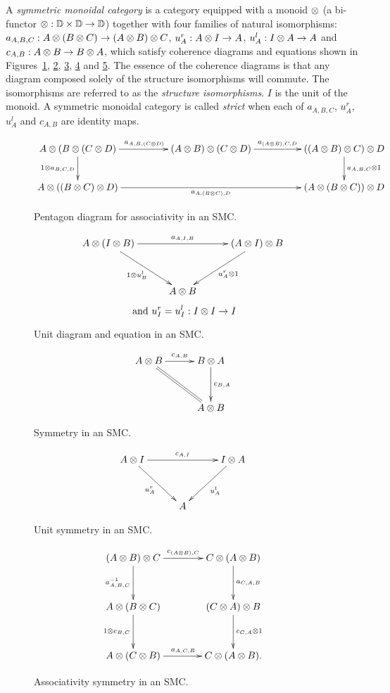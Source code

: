 \begin{definition}\label{symmetricmonoidalcat}
  A \emph{symmetric monoidal category}\cite{barr:ctcs,maclan97:categorieswrkmath} \cD{} is a
  category equipped with a monoid $\otimes$ (a bi-functor $\otimes:\mathbb{D} \times \mathbb{D} \to \mathbb{D}$) together with
  four families of natural isomorphisms:  $a_{A,B,C}:A\otimes(B\otimes C) \to (A\otimes B)\otimes C$, $u^r_{A}:A\otimes I\to A$,
  $u^l_{A}:I\otimes A \to A$ and $c_{A,B}:A\otimes B \to B\otimes A$, which satisfy coherence diagrams and
  equations shown in Figures~\ref{fig:SMC_pentagon}, \ref{fig:SMC_unit}, \ref{fig:SMC_commutes},
  \ref{fig:SMC_unit_symmettry} and \ref{fig:SMC_associativity_symmetry}. The essence of the
  coherence diagrams is that any diagram composed solely of the structure isomorphisms will
  commute. The isomorphisms are referred to as the \emph{structure isomorphisms}. $I$ is the
  unit of the monoid. A symmetric monoidal category is called \emph{strict} when each of
  $a_{A,B,C}$, $u^r_{A}$, $u^l_{A}$ and $c_{A,B}$ are identity maps.
\end{definition}

\begin{figure}[!htbp]
\[
  \xymatrix@C+25pt{
    A\*(B\*(C\*D) \ar[r]^{a_{A,B,(C\*D)}} \ar[d]_{1\*a_{B,C,D}}
      & (A\*B)\*(C\*D) \ar[r]^{a_{(A\*B),C,D}}
      & ((A\*B)\*C)\*D \ar[d]^{a_{A,B,C}\*1}\\
    A\*((B\*C)\*D) \ar[rr]_{a_{A,(B\*C),D}}
      && (A\*(B\*C))\*D
  }
\]
\caption{Pentagon diagram for associativity in an SMC.}\label{fig:SMC_pentagon}
\end{figure}
\begin{figure}[!htbp]
\[
  \xymatrix@C+5pt@R+10pt{
    A\*(I\*B) \ar[rr]^{a_{A,I,B}} \ar[dr]_{1\*u^l_B}
      && (A\*I)\*B \ar[dl]^{u^r_A \* 1}\\
      &A\*B
  }
\]
\[\text{ and } u^r_I = u^l_I: I\otimes I \to I\]
\caption{Unit diagram and equation in an SMC.}\label{fig:SMC_unit}
\end{figure}
\begin{figure}[!htbp]
\[
  \xymatrix@C+5pt@R+10pt{
    A\*B \ar[r]^{c_{A,B}} \ar@{=}[dr]
      & B\*A \ar[d]^{c_{B,A}}\\
      &A\*B
  }
\]
\caption{Symmetry in an SMC.}\label{fig:SMC_commutes}
\end{figure}
\begin{figure}[!htbp]
\[
  \xymatrix@C+5pt@R+10pt{
    A\*I \ar[rr]^{c_{A,I}} \ar[dr]_{u^r_A}
      && I\*A \ar[dl]^{u^l_A}\\
      &A
  }
\]
\caption{Unit symmetry in an SMC.}\label{fig:SMC_unit_symmettry}
\end{figure}
\begin{figure}[!htbp]
\[
  \xymatrix@C+15pt@R+10pt{
    (A\*B)\*C \ar[r]^{c_{(A\*B),C}} \ar[d]_{a^{-1}_{A,B,C}}
      & C\*(A\*B) \ar[d]^{a_{C,A,B}}\\
    A\*(B\*C) \ar[d]_{1\*c_{B,C}}
      & (C\*A)\*B \ar[d]^{c_{C,A}\*1}\\
    A\*(C\*B) \ar[r]^{a_{A,C,B}}
      & C\*(A\*B).
  }
\]
\caption{Associativity symmetry in an SMC.}\label{fig:SMC_associativity_symmetry}
\end{figure}
